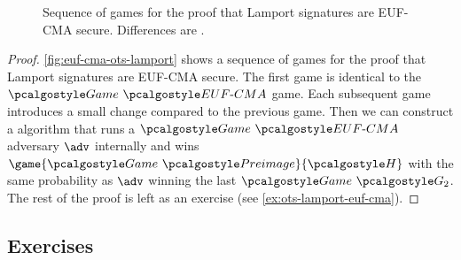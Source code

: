 \begin{figure}[tbh]
\begin{tcolorbox}
\begin{pchstack}[center]
\begin{pcvstack}
    \pcvspace
   \end{pcvstack}
  \end{pchstack}
 \end{tcolorbox}
 \caption{Sequence of games for the proof that Lamport signatures are EUF-CMA secure. Differences are .}
 \label{fig:euf-cma-ots-lamport}
\end{figure}


\begin{proof}
    \autoref{fig:euf-cma-ots-lamport} shows a sequence of games for the proof that Lamport signatures are EUF-CMA secure.
    The first game is identical to the $\Game~\algo{EUF\text{-}CMA}$ game.
    Each subsequent game introduces a small change compared to the previous game.
    Then we can construct a \ppt algorithm that runs a $\Game~\algo{EUF\text{-}CMA}$ adversary $\adv$ internally and wins $\game{\Game~\algo{Preimage}}{\algo{H}}$ with the same probability as $\adv$ winning the last  $\Game~\algo{G_2}$.
    The rest of the proof is left as an exercise (see \autoref{ex:ots-lamport-euf-cma}).
\end{proof}

\subsection{Exercises}

